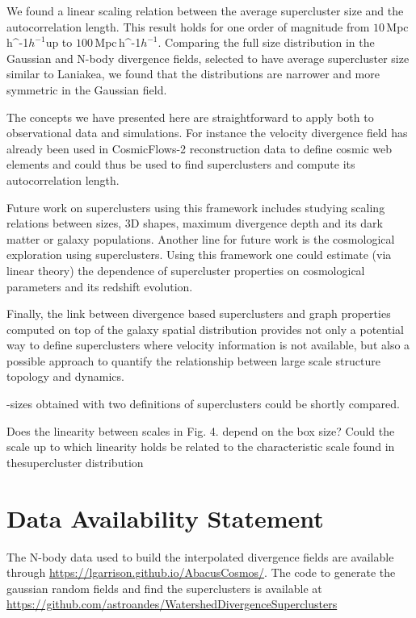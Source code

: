 \documentclass[usenatbib]{mnras}
\newcommand{\Mpch}{\,{\rm Mpc}\,\ifmmode h^{-1}\else $h^{-1}$\fi}
\begin{document}
We found a linear scaling relation between the average supercluster size and the autocorrelation length. 
This result holds for one order of magnitude from $10$\Mpch up to $100$\Mpch.
Comparing the full size distribution in the Gaussian and N-body divergence fields, selected to have average supercluster size similar to Laniakea, we found that the distributions are narrower and more symmetric in the Gaussian field.

The concepts we have presented here are straightforward to apply both to observational data and simulations.
For instance the velocity divergence field has already been used in CosmicFlows-2 reconstruction data to define cosmic web elements \citep{2015MNRAS.452.1052L} and could thus be used to find superclusters and compute its autocorrelation length.

Future work on superclusters using this framework includes studying scaling relations between sizes, 3D shapes, maximum divergence depth and its dark matter or galaxy populations.
Another line for future work is the cosmological exploration using superclusters.
Using this framework one could estimate (via linear theory) the dependence of supercluster properties on cosmological parameters and its redshift evolution.

Finally, the link between divergence based superclusters and graph properties \citep{2020MNRAS.498L.145G} computed on top of the galaxy spatial distribution provides not only a potential way to define superclusters where velocity information is not available, but also a possible approach to quantify the relationship between large scale structure topology and dynamics.

-sizes obtained with two definitions
of superclusters could be shortly compared.

Does the linearity between scales in Fig. 4. depend on the box size?
Could the scale up to which linearity holds
be related to the characteristic scale found in thesupercluster distribution

\section*{Data Availability Statement}
The N-body data used to build the interpolated divergence fields are available through \url{https://lgarrison.github.io/AbacusCosmos/}. 
The code to generate the gaussian random fields and find the superclusters is available at \url{https://github.com/astroandes/WatershedDivergenceSuperclusters}



\end{document}
